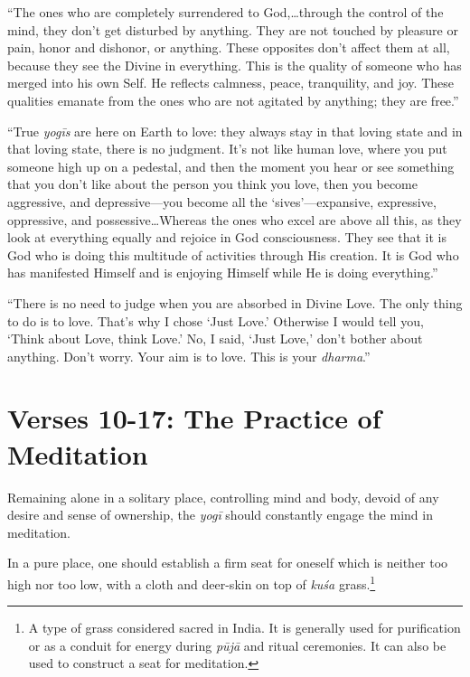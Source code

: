 \enquote{The ones who are completely surrendered to God,\ldots through the control of the mind, they don’t get disturbed by anything. They are not touched by pleasure or pain, honor and dishonor, or anything. These opposites don’t affect them at all, because they see the Divine in everything. This is the quality of someone who has merged into his own Self. He reflects calmness, peace, tranquility, and joy. These qualities emanate from the ones who are not agitated by anything; they are free.}

\enquote{True \textit{yogīs} are here on Earth to love: they always stay in that loving state and in that loving state, there is no judgment. It’s not like human love, where you put someone high up on a pedestal, and then the moment you hear or see something that you don’t like about the person you think you love, then you become aggressive, and depressive---you become all the \enquote{sives}---expansive, expressive, oppressive, and possessive\ldots Whereas the ones who excel are above all this, as they look at everything equally and rejoice in God consciousness. They see that it is God who is doing this multitude of activities through His creation. It is God who has manifested Himself and is enjoying Himself while He is doing everything.}

\enquote{There is no need to judge when you are absorbed in Divine Love. The only thing to do is to love. That’s why I chose \enquote{Just Love.} Otherwise I would tell you, \enquote{Think about Love, think Love.} No, I said, \enquote{Just Love,} don’t bother about anything. Don’t worry. Your aim is to love. This is your \textit{dharma}.}

\section{Verses 10-17: The Practice of Meditation}\label{sec-verses-10-17-the-practice-of-meditation}
{Remaining alone in a solitary place, controlling mind and body, devoid of any desire and sense of ownership, the \textit{yogī} should constantly engage the mind in meditation.}

{In a pure place, one should establish a firm seat for oneself which is neither too high nor too low, with a cloth and deer-skin on top of \textit{kuśa} grass.\footnote{A type of grass considered sacred in India. It is generally used for purification or as a conduit for energy during \textit{pūjā} and ritual ceremonies. It can also be used to construct a seat for meditation.}}

